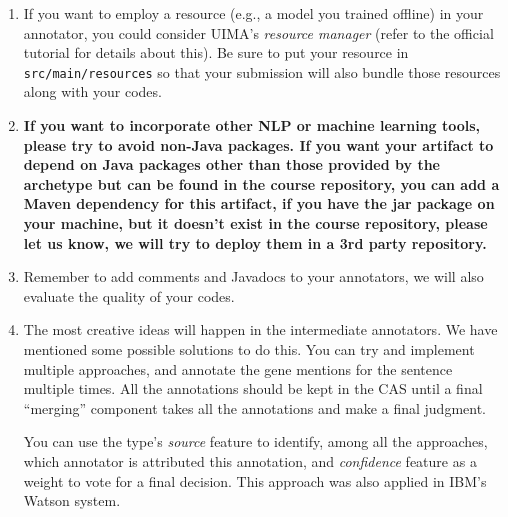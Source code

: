 \begin{enumerate}

\item If you want to employ a resource (e.g., a model you trained offline) in
your annotator, you could consider UIMA's \emph{resource manager} (refer to the
official tutorial for details about this).
Be sure to put your resource in \texttt{src/main/resources} so that your
submission will also bundle those resources along with your codes.

\item \textbf{If you want to incorporate other NLP or machine learning tools,
please try to avoid non-Java packages. If you want your artifact to depend on
Java packages other than those provided by the archetype but can be found
in the course repository, you can add a Maven dependency for this artifact, if
you have the jar package on your machine, but it doesn't exist in the course
repository, please let us know, we will try to deploy them in a 3rd party
repository.}

\item Remember to add comments and Javadocs to your annotators, we will also
evaluate the quality of your codes.

\item The most creative ideas will happen in the intermediate annotators. We
have mentioned some possible solutions to do this. You can try and implement
multiple approaches, and annotate the gene mentions for the sentence multiple
times. All the annotations should be kept in the CAS until a final ``merging''
component takes all the annotations and make a final judgment.

You can use the type's \emph{source} feature to identify, among all the
approaches, which annotator is attributed this annotation, and \emph{confidence}
feature as a weight to vote for a final decision. This approach was also applied
in IBM's Watson system.

\end{enumerate}
